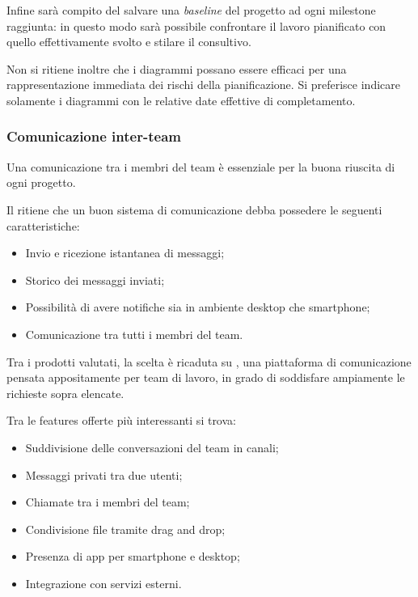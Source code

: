 Infine sarà compito del  salvare una \textit{baseline} del progetto ad ogni milestone raggiunta: in questo modo sarà possibile confrontare il lavoro pianificato con quello effettivamente svolto e stilare il consultivo.

Non si ritiene inoltre che i diagrammi  possano essere efficaci per una rappresentazione immediata dei rischi della pianificazione. Si preferisce indicare solamente i diagrammi  con le relative date effettive di completamento.

\subsubsection{Comunicazione inter-team} 

Una comunicazione tra i membri del team è essenziale per la buona riuscita di ogni progetto.

Il  ritiene che un buon sistema di comunicazione debba possedere le seguenti caratteristiche:

\begin{itemize}
\item Invio e ricezione istantanea di messaggi;
\item Storico dei messaggi inviati;
\item Possibilità di avere notifiche  sia in ambiente desktop che smartphone;
\item Comunicazione tra tutti i membri del team.
\end{itemize}

Tra i prodotti valutati, la scelta è ricaduta su , una piattaforma di comunicazione pensata appositamente per team di lavoro, in grado di soddisfare ampiamente le richieste sopra elencate.

Tra le features offerte più interessanti si trova:

\begin{itemize}
\item Suddivisione delle conversazioni del team in canali;
\item Messaggi privati tra due utenti;
\item Chiamate tra i membri del team; 
\item Condivisione file tramite drag and drop;
\item Presenza di app per smartphone e desktop;
\item Integrazione con servizi esterni.
\end{itemize}

